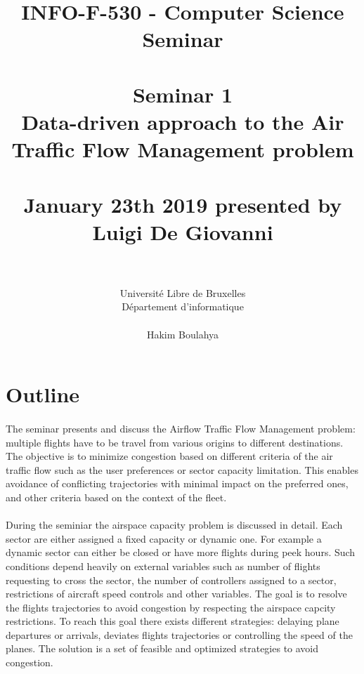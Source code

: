 \documentclass[11pt,a4paper]{article}
\date{}
\begin{document}
\title{
\large INFO-F-530 - Computer Science Seminar \\~\\
\LARGE Seminar 1 \\ Data-driven approach to the Air Traffic Flow Management problem \\~\\
\Large January 23th 2019 presented by Luigi De Giovanni \\~\\}
\author{Université Libre de Bruxelles \\
Département d'informatique \\
\\ Hakim Boulahya}
\maketitle

\section{Outline}

\paragraph{}

The seminar presents and discuss the Airflow Traffic Flow Management problem: multiple flights have to be travel from various origins to different destinations. The objective is to minimize congestion based on different criteria of the air traffic flow such as the user preferences or sector capacity limitation. This enables avoidance of conflicting trajectories with minimal impact on the preferred ones, and other criteria based on the context of the fleet.


\paragraph{}

During the seminiar the airspace capacity problem is discussed in detail. Each sector are either assigned a fixed capacity or dynamic one. For example a dynamic sector can either be closed or have more flights during peek hours. Such conditions depend heavily on external variables such as number of flights requesting to cross the sector, the number of controllers assigned to a sector, restrictions of aircraft speed controls and other variables. The goal is to resolve the flights trajectories to avoid congestion by respecting the airspace capcity restrictions. To reach this goal there exists different strategies: delaying plane departures or arrivals, deviates flights trajectories or controlling the speed of the planes. The solution is a set of feasible and optimized strategies to avoid congestion.
\end{document}
